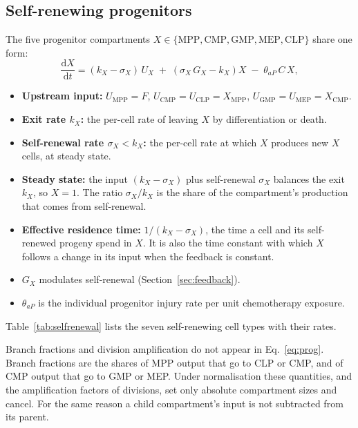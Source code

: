 \documentclass[11pt]{article}
\newcommand{\dd}{\mathrm{d}}
\newcommand{\X}[1]{X_{\mathrm{#1}}}
\begin{document}
\subsection{Self-renewing progenitors}\label{sec:progenitors}
The five progenitor compartments $X\in\{\mathrm{MPP},\mathrm{CMP},\mathrm{GMP},\mathrm{MEP},\mathrm{CLP}\}$ share one form:
\begin{equation}
\frac{\dd X}{\dd t} = (k_X-\sigma_X)\,U_X \;+\; \left(\sigma_X\,G_X - k_X\right) X \;-\; \theta_{aP}\,C\,X, \label{eq:prog}
\end{equation}
\begin{itemize}
\item \textbf{Upstream input:} $U_{\mathrm{MPP}}=F$, $U_{\mathrm{CMP}}=U_{\mathrm{CLP}}=\X{MPP}$, $U_{\mathrm{GMP}}=U_{\mathrm{MEP}}=\X{CMP}$.
\item \textbf{Exit rate $k_X$:} the per-cell rate of leaving $X$ by differentiation or death.
\item \textbf{Self-renewal rate $\sigma_X<k_X$:} the per-cell rate at which $X$ produces new $X$ cells, at steady state.
\item \textbf{Steady state:} the input $(k_X-\sigma_X)$ plus self-renewal $\sigma_X$ balances the exit $k_X$, so $X=1$. The ratio $\sigma_X/k_X$ is the share of the compartment's production that comes from self-renewal.
\item \textbf{Effective residence time:} $1/(k_X-\sigma_X)$, the time a cell and its self-renewed progeny spend in $X$. It is also the time constant with which $X$ follows a change in its input when the feedback is constant.
\item \textbf{$G_X$} modulates self-renewal (Section~\ref{sec:feedback}).
\item \textbf{$\theta_{aP}$} is the individual progenitor injury rate per unit chemotherapy exposure.
\end{itemize}
Table~\ref{tab:selfrenewal} lists the seven self-renewing cell types with their rates.

Branch fractions and division amplification do not appear in Eq.~\ref{eq:prog}. Branch fractions are the shares of MPP output that go to CLP or CMP, and of CMP output that go to GMP or MEP. Under normalisation these quantities, and the amplification factors of divisions, set only absolute compartment sizes and cancel. For the same reason a child compartment's input is not subtracted from its parent.
\end{document}
